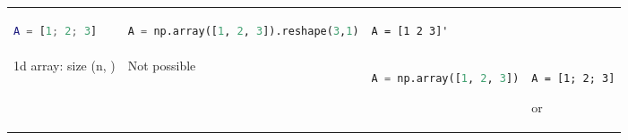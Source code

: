 \documentclass[10pt, landscape]{article}
\begin{document}
\begin{multicols}{2}
\begin{tabular}[]{@{}llll@{}}
\begin{minipage}[t]{0.19\columnwidth}
\begin{lstlisting}[language=Matlab]
A = [1; 2; 3]
\end{lstlisting}
\strut
\end{minipage} & \begin{minipage}[t]{0.29\columnwidth}\raggedright\strut
\begin{lstlisting}[language=Python]
A = np.array([1, 2, 3]).reshape(3,1)
\end{lstlisting}
\strut
\end{minipage} & \begin{minipage}[t]{0.19\columnwidth}\raggedright\strut
\begin{lstlisting}
A = [1 2 3]'
\end{lstlisting}
\strut
\end{minipage}\tabularnewline
\begin{minipage}[t]{0.21\columnwidth}\raggedright\strut
1d array: size (n, )\strut
\end{minipage} & \begin{minipage}[t]{0.19\columnwidth}\raggedright\strut
Not possible\strut
\end{minipage} & \begin{minipage}[t]{0.29\columnwidth}\raggedright\strut
\begin{lstlisting}[language=Python]
A = np.array([1, 2, 3])
\end{lstlisting}
\strut
\end{minipage} & \begin{minipage}[t]{0.19\columnwidth}\raggedright\strut
\begin{lstlisting}
A = [1; 2; 3]
\end{lstlisting}

or


\end{minipage}
\end{tabular}
\end{multicols}
\end{document}
